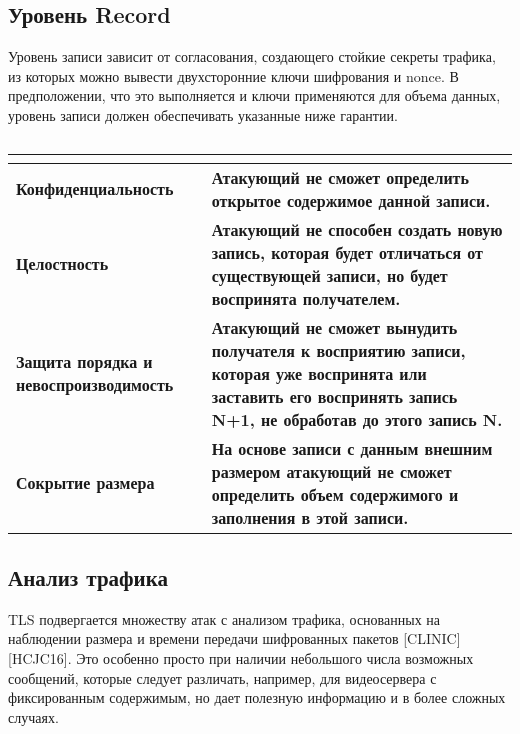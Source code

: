     \subsection{Уровень Record}
    
    Уровень записи зависит от согласования, создающего стойкие секреты трафика, из которых можно вывести двухсторонние ключи шифрования и nonce. В предположении, что это выполняется и ключи применяются для объема данных, уровень записи должен обеспечивать указанные ниже гарантии.
    
    \begin{table}[h!]
    	\begin{center}
    		\caption{}
    		\label{tbl:level_record}
    		\begin{tabular}{|p{6cm}|p{10cm}|}
    			\hline \textbf{} & \textbf{}  \\
    			\hline \textbf{Конфиденциальность} & \textbf{Атакующий не сможет определить открытое содержимое данной записи.} \\
    			\hline \textbf{Целостность} & \textbf{Атакующий не способен создать новую запись, которая будет отличаться от существующей записи, но будет воспринята получателем.} \\
    			\hline \textbf{Защита порядка и невоспроизводимость} & \textbf{Атакующий не сможет вынудить получателя к восприятию записи, которая уже воспринята или заставить его воспринять запись N+1, не обработав до этого запись N.} \\
    			\hline \textbf{Сокрытие размера} & \textbf{На основе записи с данным внешним размером атакующий не сможет определить объем содержимого и заполнения в этой записи.} \\
    			
    			\hline
    		\end{tabular}
    	\end{center} 		
    	
    \end{table}
    
    
    \subsection{Анализ трафика}
    
    TLS подвергается множеству атак с анализом трафика, основанных на наблюдении размера и времени передачи шифрованных пакетов [CLINIC] [HCJC16]. Это особенно просто при наличии небольшого числа возможных сообщений, которые следует различать, например, для видеосервера с фиксированным содержимым, но дает полезную информацию и в более сложных случаях.
    
